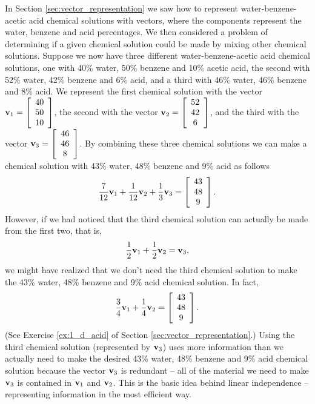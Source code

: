 \label{sec:indep_intro}

In Section \ref{sec:vector_representation} we saw how to represent water-benzene-acetic acid chemical solutions with vectors, where the components represent the water, benzene and acid percentages.  We then considered a problem of determining if a given chemical solution could be made by mixing other chemical solutions. Suppose we now have three different water-benzene-acetic acid chemical solutions, one with 40\% water, 50\% benzene and 10\% acetic acid, the second with 52\% water, 42\% benzene and 6\% acid, and a third with 46\% water, 46\% benzene and 8\% acid. We represent the first chemical solution with the vector $\mathbf{v}_1 = \left[ \begin{array}{c} 40\\50\\10\end{array} \right]$, the second with the vector $\mathbf{v}_2 = \left[ \begin{array}{c} 52\\42\\6\end{array} \right]$, and the third with the vector $\mathbf{v}_3 = \left[ \begin{array}{c} 46\\46\\8\end{array} \right]$. By combining these three chemical solutions we can make a chemical solution with 43\% water, 48\% benzene and 9\% acid as follows
\[\frac{7}{12}\mathbf{v}_1 + \frac{1}{12} \mathbf{v}_2 + \frac{1}{3}\mathbf{v}_3 = \left[ \begin{array}{c} 43\\48\\9\end{array} \right].\]
However, if we had noticed that the third chemical solution can actually be made from the first two, that is,
\[\frac{1}{2}\mathbf{v}_1 + \frac{1}{2} \mathbf{v}_2 = \mathbf{v}_3,\]
we might have realized that we don't need the third chemical solution to make the 43\% water, 48\% benzene and 9\% acid chemical solution. In fact, 
\[\frac{3}{4}\mathbf{v}_1 + \frac{1}{4} \mathbf{v}_2 = \left[ \begin{array}{c} 43\\48\\9\end{array} \right].\]
(See Exercise \ref{ex:1_d_acid} of Section \ref{sec:vector_representation}.) Using the third chemical solution (represented by $\mathbf{v}_3$) uses more information than we actually need to make the desired 43\% water, 48\% benzene and 9\% acid chemical solution because the vector $\mathbf{v}_3$ is redundant -- all of the material we need to make $\mathbf{v}_3$ is contained in $\mathbf{v}_1$ and $\mathbf{v}_2$. This is the basic idea behind linear independence -- representing information in the most efficient way.

